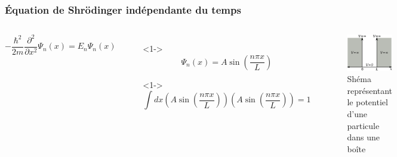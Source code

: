 \documentclass[aspectratio=169]{beamer}
\begin{document}
\begin{frame}
\frametitle{Équation de Shrödinger indépendante du temps}

\begin{columns}

\begin{equation}\tag{4}
-\frac{\hbar^2}{2m}\frac{\partial^2}{\partial x^2}\Psi_n(x)=E_n\Psi_n(x)
\end{equation} 

\begin{itemize}
\item[]<1-> \begin{equation}\tag{5}
\Psi_n(x)=A\sin(\frac{n\pi x}{L})
\end{equation}  
\item[]<1-> \begin{equation}\tag{6}
\int dx (A\sin(\frac{n\pi x}{L}))(A\sin(\frac{n\pi x}{L}))=1
\end{equation}  
\end{itemize}
\begin{figure}
\includegraphics[scale=0.4]{Pot}
\caption{Shéma représentant le potentiel d'une particule dans une boîte}
\end{figure}
\end{columns}

\end{frame}
\end{document}
